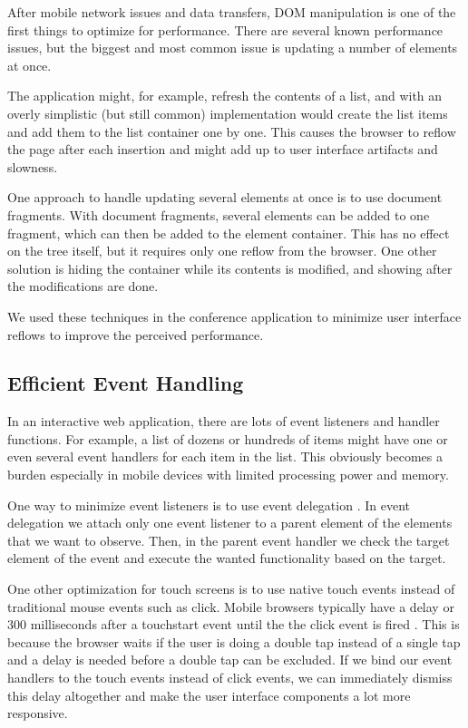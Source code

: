 After mobile network issues and data transfers, DOM manipulation is
one of the first things to optimize for performance. There are several
known performance issues, but the biggest and most common issue is
updating a number of elements at once. \cite{zakas2010high}

The application might, for example, refresh the contents of a list,
and with an overly simplistic (but still common) implementation would
create the list items and add them to the list container one by
one. This causes the browser to reflow the page after each insertion
and might add up to user interface artifacts and
slowness. \citationneeded

One approach to handle updating several elements at once is to use
document fragments. With document fragments, several elements can be
added to one fragment, which can then be added to the element
container. This has no effect on the  tree itself, but it
requires only one reflow from the browser. One other solution is
hiding the container while its contents is modified, and showing after
the modifications are done. \cite{zakas2010high}

We used these techniques in the conference application to minimize
user interface reflows to improve the perceived performance.

\subsection{Efficient Event Handling}

In an interactive web application, there are lots of event listeners
and handler functions. For example, a list of dozens or hundreds of
items might have one or even several event handlers for each item in
the list. This obviously becomes a burden especially in mobile devices
with limited processing power and memory.

One way to minimize event listeners is to use event delegation
\cite{zakas2010high}. In event delegation we attach only one event
listener to a parent element of the elements that we want to
observe. Then, in the parent event handler we check the target element
of the event and execute the wanted functionality based on the target.

One other optimization for touch screens is to use native touch events
instead of traditional mouse events such as click. Mobile browsers
typically have a delay or 300 milliseconds after a touchstart event
until the the click event is fired \citationneeded. This is because
the browser waits if the user is doing a double tap instead of a
single tap and a delay is needed before a double tap can be
excluded. If we bind our event handlers to the touch events instead of
click events, we can immediately dismiss this delay altogether and
make the user interface components a lot more responsive.

